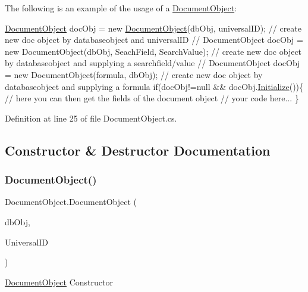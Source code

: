 The following is an example of the usage of a {\ttfamily \hyperlink{class_document_object}{Document\+Object}}\+: 
\begin{DoxyCode}
\hyperlink{class_document_object}{DocumentObject} docObj = \textcolor{keyword}{new} \hyperlink{class_document_object_a46c89e7d40b15a91542a5482b2d8a084}{DocumentObject}(dbObj, universalID); \textcolor{comment}{// create new
       doc object by databaseobject and universalID}
\textcolor{comment}{// DocumentObject docObj = new DocumentObject(dbObj, SeachField, SearchValue); // create new doc object by
       databaseobject and supplying a searchfield/value}
\textcolor{comment}{// DocumentObject docObj = new DocumentObject(formula, dbObj); // create new doc object by databaseobject
       and supplying a formula}
\textcolor{keywordflow}{if}(docObj!=null && docObj.\hyperlink{class_document_object_af4298d6cfbb9ea60643d9995309b73f1}{Initialize}())\{
     \textcolor{comment}{// here you can then get the fields of the document object}
     \textcolor{comment}{// your code here... }
\}
\end{DoxyCode}
 

Definition at line 25 of file Document\+Object.\+cs.



\subsection{Constructor \& Destructor Documentation}
\mbox{\label{class_document_object_a46c89e7d40b15a91542a5482b2d8a084}} 
\subsubsection{\texorpdfstring{Document\+Object()}{DocumentObject()}\hspace{0.1cm}{\footnotesize\ttfamily [1/3]}}
{\footnotesize\ttfamily Document\+Object.\+Document\+Object (\begin{DoxyParamCaption}\item[{\hyperlink{class_database_object}{Database\+Object}}]{db\+Obj,  }\item[{String}]{Universal\+ID }\end{DoxyParamCaption})}



\hyperlink{class_document_object}{Document\+Object} Constructor 


